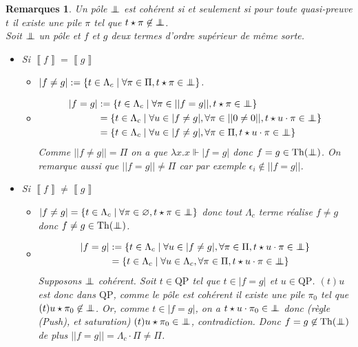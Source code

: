 \documentclass[a4paper,12pt]{article}
\theoremstyle{rmqstyle}
\newtheorem{rmqs}[theo]{Remarques}
\newcommand{\set}[1]{\{#1\}}
\newcommand{\abs}[1]{\lvert#1\rvert}
\newcommand{\abss}[1]{\lvert \lvert#1\rvert \rvert}
\newcommand{\itp}[1]{\left\llbracket#1\right\rrbracket}
\newcommand{\QP}{\mathrm{QP}}
\newcommand{\pole}{{\protect\mathpalette{\protect\polehelper}{\bot}}} \def\polehelper#1#2{\mathrel{\rlap{$#1#2$}\mkern3mu{#1#2}}}
\newcommand{\Th}{\mathrm{Th}}
\begin{document}
\begin{rmqs}\label{R1} 
Un pôle $\pole$ est cohérent si et seulement si pour toute quasi-preuve $t$ il existe une pile $\pi$ tel que $t \star \pi \not \in \pole$.\\
Soit $\pole$ un pôle et $f$ et $g$ deux termes d'ordre supérieur de même sorte. 
\begin{itemize}
\setlength\itemsep{ -1 em}
\item Si $\itp{f} = \itp{g}$
\begin{itemize}
\setlength\itemsep{ -1 em}
\item $\abs{f \neq g} := \set{ t \in \Lambda_c \mid \forall \pi \in \Pi, t \star \pi \in \pole}$.\\
\item \begin{align*}
\abs{f = g} &:= \set{ t \in \Lambda_c \mid \forall \pi \in \abss{f = g}, t \star \pi \in \pole}\\
&= \set{ t \in \Lambda_c \mid \forall u \in \abs{f \neq g}, \forall \pi \in \abss{0 \neq 0}, t \star u \cdot \pi \in \pole}\\
&= \set{ t \in \Lambda_c \mid \forall u \in \abs{f \neq g}, \forall \pi \in \Pi, t \star u \cdot \pi \in \pole}
\end{align*}
Comme $\abss{f \neq g} = \Pi$ on a que $\lambda x.x \Vdash \abs{f = g}$ donc $f = g \in \Th(\pole)$. On remarque aussi que $\abss{f = g} \neq \Pi$ car par exemple $\epsilon_i \not \in \abss{f = g}$.
\end{itemize}
\item Si $\itp{f} \neq \itp{g}$
\begin{itemize}
\setlength\itemsep{ -1 em}
\item $\abs{f \neq g} = \set{ t \in \Lambda_c \mid \forall \pi \in \varnothing, t \star \pi \in \pole}$ donc tout $\Lambda_c$ terme réalise $f \neq g$ donc $f \neq g \in \Th(\pole)$.\\
\item \begin{align*}
\abs{f = g} &:= \set{ t \in \Lambda_c \mid \forall u \in \abs{f \neq g}, \forall \pi \in \Pi, t \star u \cdot \pi \in \pole}\\
& =  \set{ t \in \Lambda_c \mid \forall u \in \Lambda_c, \forall \pi \in \Pi, t \star u \cdot \pi \in \pole}
\end{align*}
Supposons $\pole$ cohérent. Soit $t \in \QP$ tel que $t \in \abs{f = g}$ et $u \in \QP$. $(t)u$ est donc dans $\QP$, comme le pôle est cohérent il existe une pile $\pi_0$ tel que $(t)u \star \pi_0 \not \in \pole$. Or, comme $t \in \abs{f = g}$, on a $t \star u \cdot \pi_0 \in \pole$ donc (règle \textit{(Push)}, et saturation) $(t)u \star \pi_0 \in \pole$, contradiction. Donc $f = g \not \in \Th(\pole)$ de plus $\abss{f = g} = \Lambda_c \cdot \Pi \neq \Pi$.
\end{itemize}
\end{itemize}
\end{rmqs}
\end{document}
